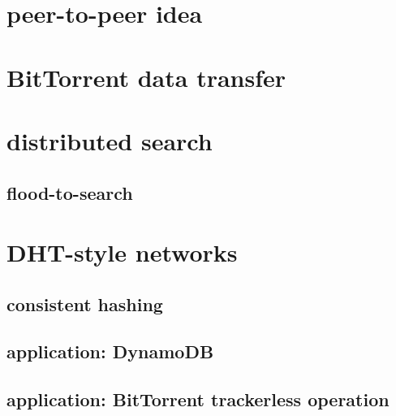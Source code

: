 \section{peer-to-peer idea}



\section{BitTorrent data transfer}



\section{distributed search}



\subsection{flood-to-search}



\section{DHT-style networks}



\subsection{consistent hashing}

\subsection{application: DynamoDB}

\subsection{application: BitTorrent trackerless operation}
